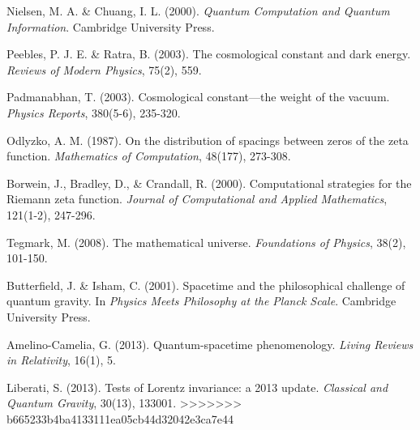 \documentclass[12pt,a4paper]{article}
\begin{document}
\begin{thebibliography}{99}
Nielsen, M. A. \& Chuang, I. L. (2000).
\textit{Quantum Computation and Quantum Information}.
Cambridge University Press.

Peebles, P. J. E. \& Ratra, B. (2003).
The cosmological constant and dark energy.
\textit{Reviews of Modern Physics}, 75(2), 559.

Padmanabhan, T. (2003).
Cosmological constant—the weight of the vacuum.
\textit{Physics Reports}, 380(5-6), 235-320.

Odlyzko, A. M. (1987).
On the distribution of spacings between zeros of the zeta function.
\textit{Mathematics of Computation}, 48(177), 273-308.

Borwein, J., Bradley, D., \& Crandall, R. (2000).
Computational strategies for the Riemann zeta function.
\textit{Journal of Computational and Applied Mathematics}, 121(1-2), 247-296.

Tegmark, M. (2008).
The mathematical universe.
\textit{Foundations of Physics}, 38(2), 101-150.

Butterfield, J. \& Isham, C. (2001).
Spacetime and the philosophical challenge of quantum gravity.
In \textit{Physics Meets Philosophy at the Planck Scale}.
Cambridge University Press.

Amelino-Camelia, G. (2013).
Quantum-spacetime phenomenology.
\textit{Living Reviews in Relativity}, 16(1), 5.

Liberati, S. (2013).
Tests of Lorentz invariance: a 2013 update.
\textit{Classical and Quantum Gravity}, 30(13), 133001.
>>>>>>> b665233b4ba4133111ea05cb44d32042e3ca7e44

\end{thebibliography}
\end{document}
